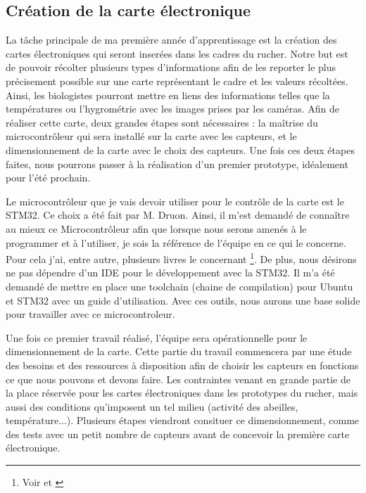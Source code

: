 \documentclass[11pt,french,a4paper]{report}
\begin{document}
{\subsection{Création de la carte électronique}
La tâche principale de ma première année d'apprentissage est la création des cartes électroniques qui seront inserées dans 
les cadres du rucher. 
Notre but est de pouvoir récolter plusieurs types d'informations afin de les reporter le plus précisement possible sur une carte 
représentant le cadre et les valeurs récoltées. 
Ainsi, les biologistes pourront mettre en liens des informations telles que la températures ou l'hygrométrie avec les images 
prises par les caméras. 
Afin de réaliser cette carte, deux grandes étapes sont nécessaires : la maîtrise du microcontrôleur qui sera installé sur la 
carte avec les capteurs, et le dimensionnement de la carte avec le choix des capteurs. Une fois ces deux étapes faites, nous pourrons 
passer à la réalisation d'un premier prototype, idéalement pour l'été prochain. 

Le microcontrôleur que je vais devoir utiliser pour le contrôle de la carte est le STM32. Ce choix a été fait par M. Druon. 
Ainsi, il m'est demandé de connaître au mieux ce Microcontrôleur afin que lorsque nous serons amenés à le programmer et à l'utiliser, 
je sois la référence de l'équipe en ce qui le concerne. 
Pour cela j'ai, entre autre, plusieurs livres le concernant \footnote{Voir \cite{book1} et \cite{}}. 
De plus, nous désirons ne pas dépendre d'un IDE pour le développement avec la STM32. Il m'a été demandé de mettre en place 
une toolchain (chaine de compilation) pour Ubuntu et STM32 avec un guide d'utilisation. 
Avec ces outils, nous aurons une base solide pour travailler avec ce microcontroleur. 

Une fois ce premier travail réalisé, l'équipe sera opérationnelle pour le dimensionnement de la carte. Cette partie du travail
commencera par une étude des besoins et des ressources à disposition afin de choisir les capteurs en fonctions ce que nous pouvons
et devons faire. 
Les contraintes venant en grande partie de la place réservée pour les cartes électroniques dans les prototypes du rucher, mais 
aussi des conditions qu'imposent un tel milieu (activité des abeilles, température...). 
Plusieurs étapes viendront consituer ce dimensionnement, comme des tests avec un petit nombre de capteurs avant de concevoir la
première carte électronique. 

}
\end{document}
